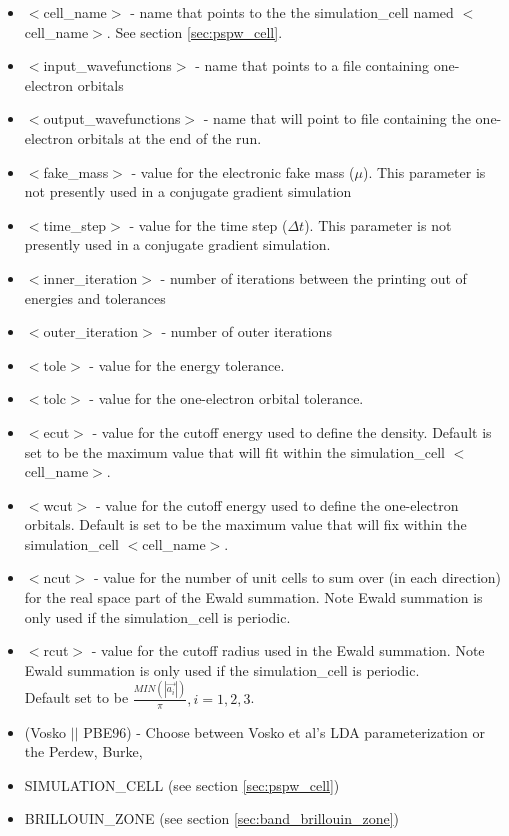 \begin{itemize}
        \item $<$cell\_name$>$ - name that points to the
              the simulation\_cell named $<$cell\_name$>$.  See section \ref{sec:pspw_cell}.
        \item $<$input\_wavefunctions$>$ - name that points
              to a file containing one-electron orbitals
        \item $<$output\_wavefunctions$>$ - name that will
              point to file containing the one-electron orbitals at the
              end of the run. 
        \item $<$fake\_mass$>$ - value for the electronic
              fake mass ($\mu$). This parameter is not presently used in a 
              conjugate gradient simulation
        \item $<$time\_step$>$ - value for the time step ($\Delta t$).  This
              parameter is not presently used in a conjugate gradient simulation.
        \item $<$inner\_iteration$>$ - number of iterations between the 
              printing out of energies and tolerances
        \item $<$outer\_iteration$>$ - number of outer iterations
        \item $<$tole$>$ - value for the energy tolerance.
        \item $<$tolc$>$ - value for the one-electron orbital tolerance.
        \item $<$ecut$>$ - value for the cutoff energy used
                           to define the density. Default is set
                           to be the maximum value that will fit
                            within the simulation\_cell $<$cell\_name$>$.
        \item $<$wcut$>$ - value for the cutoff energy used
                           to define the one-electron orbitals.
                           Default is set to be the maximum value that 
                           will fix within the simulation\_cell $<$cell\_name$>$.
        \item $<$ncut$>$ - value for the number of unit cells
                          to sum over (in each direction) for the real space
                          part of the Ewald summation. Note Ewald summation
                          is only used if the simulation\_cell is periodic.
        \item $<$rcut$>$ - value for the cutoff radius used
                          in the Ewald summation. Note Ewald summation
                          is only used if the simulation\_cell is periodic. \\
                           Default set to be
                          $\frac{MIN(\left| \vec{a_i} \right|)}{\pi}, i=1,2,3$.
        \item (Vosko $||$ PBE96) - Choose between Vosko et al's LDA 
                               parameterization or the Perdew, Burke, 
        \item SIMULATION\_CELL (see section \ref{sec:pspw_cell})
        \item BRILLOUIN\_ZONE  (see section \ref{sec:band_brillouin_zone})
\end{itemize}


